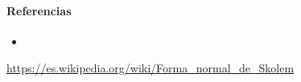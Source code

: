 \documentclass{article}
\begin{document}
\paragraph{Referencias} 

\begin{itemize}
\item
\end{itemize}
\url{https://es.wikipedia.org/wiki/Forma_normal_de_Skolem}
\end{document}

